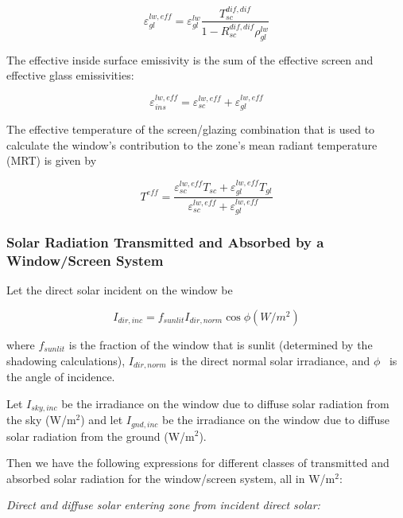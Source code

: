 \begin{equation}
\varepsilon_{gl}^{lw,eff} = \varepsilon_{gl}^{lw}\frac{{T_{sc}^{dif,dif}}}{{1 - R_{sc}^{dif,dif}\rho_{gl}^{lw}}}
\end{equation}

The effective inside surface emissivity is the sum of the effective screen and effective glass emissivities:

\begin{equation}
\varepsilon_{ins}^{lw,eff} = \varepsilon_{sc}^{lw,eff} + \varepsilon_{gl}^{lw,eff}
\end{equation}

The effective temperature of the screen/glazing combination that is used to calculate the window's contribution to the zone's mean radiant temperature (MRT) is given by

\begin{equation}
{T^{eff}} = \frac{{\varepsilon_{sc}^{lw,eff}{T_{sc}} + \varepsilon_{gl}^{lw,eff}{T_{gl}}}}{{\varepsilon_{sc}^{lw,eff} + \varepsilon_{gl}^{lw,eff}}}
\end{equation}

\subsubsection{Solar Radiation Transmitted and Absorbed by a Window/Screen System}\label{solar-radiation-transmitted-and-absorbed-by-a-windowscreen-system}

Let the direct solar incident on the window be

\begin{equation}
{I_{dir,inc}} = {f_{sunlit}}{I_{dir,norm}}\cos \phi {\mathrm{    }}(W/{m^2})
\end{equation}

where \({f_{sunlit}}\) is the fraction of the window that is sunlit (determined by the shadowing calculations), \({I_{dir,norm}}\) is the direct normal solar irradiance, and \(\phi\) ~is the angle of incidence.

Let \({I_{sky,inc}}\) be the irradiance on the window due to diffuse solar radiation from the sky (W/m\(^{2}\)) and let \({I_{gnd,inc}}\) be the irradiance on the window due to diffuse solar radiation from the ground (W/m\(^{2}\)).

Then we have the following expressions for different classes of transmitted and absorbed solar radiation for the window/screen system, all in W/m\(^{2}\):

\emph{Direct and diffuse solar entering zone from incident direct solar:}

